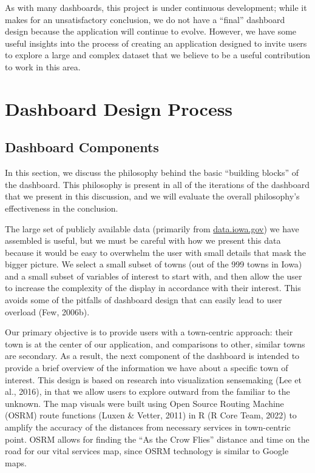 \documentclass[print]{nuthesis}
\begin{document}
As with many dashboards, this project is under continuous development; while it makes for an unsatisfactory conclusion, we do not have a ``final'' dashboard design because the application will continue to evolve. However, we have some useful insights into the process of creating an application designed to invite users to explore a large and complex dataset that we believe to be a useful contribution to work in this area.

\hypertarget{dashboard-design-process}{%
\section{Dashboard Design Process}\label{dashboard-design-process}}

\hypertarget{dashboard-components}{%
\subsection{Dashboard Components}\label{dashboard-components}}

In this section, we discuss the philosophy behind the basic ``building blocks'' of the dashboard. This philosophy is present in all of the iterations of the dashboard that we present in this discussion, and we will evaluate the overall philosophy's effectiveness in the conclusion.

The large set of publicly available data (primarily from \url{data.iowa.gov}) we have assembled is useful, but we must be careful with how we present this data because it would be easy to overwhelm the user with small details that mask the bigger picture. We select a small subset of towns (out of the 999 towns in Iowa) and a small subset of variables of interest to start with, and then allow the user to increase the complexity of the display in accordance with their interest. This avoids some of the pitfalls of dashboard design that can easily lead to user overload (Few, 2006b).

Our primary objective is to provide users with a town-centric approach: their town is at the center of our application, and comparisons to other, similar towns are secondary. As a result, the next component of the dashboard is intended to provide a brief overview of the information we have about a specific town of interest. This design is based on research into visualization sensemaking (Lee et al., 2016), in that we allow users to explore outward from the familiar to the unknown. The map visuals were built using Open Source Routing Machine (OSRM) route functions (Luxen \& Vetter, 2011) in R (R Core Team, 2022) to amplify the accuracy of the distances from necessary services in town-centric point. OSRM allows for finding the ``As the Crow Flies'' distance and time on the road for our vital services map, since OSRM technology is similar to Google maps.
\end{document}
